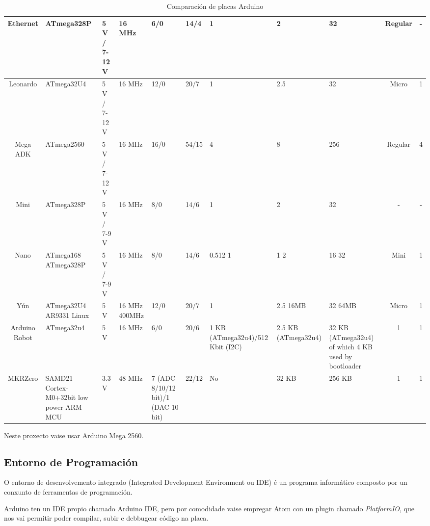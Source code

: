 \documentclass[11pt,twoside]{book}
\begin{document}
\begin{table}[htb]
\begin{center}
{\begin{tabular}{|c|m{3cm}|m{3.5cm}|m{2cm}|m{2cm}|m{2cm}|m{2cm}|m{2cm}|m{2cm}|c|c|}
\hline
Ethernet & ATmega328P & 5 V / 7-12 V & 16 MHz & 6/0 & 14/4 & 1 & 2 & 32 & Regular & - \\
\hline
Leonardo & ATmega32U4 & 5 V / 7-12 V & 16 MHz & 12/0 & 20/7 & 1 & 2.5 & 32 & Micro & 1 \\
\hline
Mega ADK & ATmega2560 & 5 V / 7-12 V & 16 MHz & 16/0 & 54/15 & 4 & 8 & 256 & Regular & 4 \\
\hline
Mini & ATmega328P & 5 V / 7-9 V & 16 MHz & 8/0 & 14/6 & 1 & 2 & 32 & - & - \\
\hline
Nano & ATmega168 \newline ATmega328P & 5 V / 7-9 V & 16 MHz & 8/0 & 14/6 & 0.512  1 & 1  2 & 16 32 & Mini & 1 \\
\hline
Yún & ATmega32U4 \newline AR9331 Linux & 5 V & 16 MHz \newline 400MHz & 12/0 & 20/7 & 1 & 2.5 \newline  16MB & 32 \newline   64MB & Micro & 1 \\
\hline
Arduino Robot & ATmega32u4 & 5 V & 16 MHz & 6/0 & 20/6 & 1 KB (ATmega32u4)/512 Kbit (I2C) & 2.5 KB (ATmega32u4) & 32 KB (ATmega32u4) of which 4 KB used by bootloader & 1 & 1 \\
\hline
MKRZero & SAMD21 \newline  Cortex-M0+32bit low power \newline ARM MCU & 3.3 V & 48 MHz & 7 (ADC 8/10/12 bit)/1 (DAC 10 bit) & 22/12 & No & 32 KB & 256 KB & 1 & 1 \\
\hline
\end{tabular}
}
\caption{Comparación de placas Arduino}
\label{taboa:comparacionPlacasArduino}
\end{center}
\end{table}

Neste proxecto vaise usar Arduino Mega 2560.

\subsection{Entorno de Programación}

O entorno de desenvolvemento integrado (Integrated Development Environment ou IDE) é un programa informático composto por un conxunto de ferramentas de programación. 

Arduino ten un IDE propio chamado Arduino IDE, pero por comodidade vaise empregar Atom con un plugin chamado \textit{PlatformIO}, que nos vai permitir poder compilar, subir e debbugear código na placa.
\end{document}
